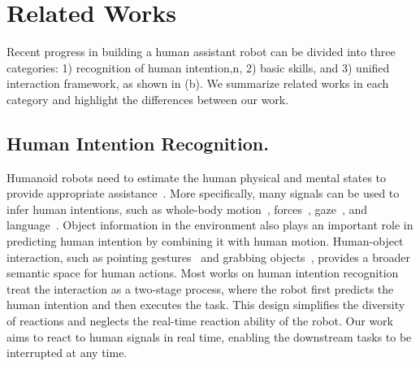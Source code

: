 
\section{Related Works}
Recent progress in building a human assistant robot can be divided into three categories: 1) recognition of human intention,n, 2) basic skills, and 3) unified interaction framework, as shown in (b).
We summarize related works in each category and highlight the differences between our work.

\subsection{Human Intention Recognition.}
Humanoid robots need to estimate the human physical and mental states to provide appropriate assistance~\cite{vianelloHumanHumanoidInteractionCooperation2021}.
More specifically, many signals can be used to infer human intentions, such as whole-body motion~\cite{tulbureFastPerceptionHumanRobot2024, yangReactiveHumantoRobotHandovers2021}, forces~\cite{agravante2019human}, gaze~\cite{duarteActionAnticipationReading2018,scherfAreYouSure2024}, and language~\cite{tanneberg2024help}.
Object information in the environment also plays an important role in predicting human intention by combining it with human motion.
Human-object interaction, such as pointing gestures~\cite{fangEgoPAT3Dv2Predicting3D2024} and grabbing objects~\cite{mascaro2023hoi4abot}, provides a broader semantic space for human actions.
Most works on human intention recognition treat the interaction as a two-stage process, where the robot first predicts the human intention and then executes the task. This design simplifies the diversity of reactions and neglects the real-time reaction ability of the robot. Our work aims to react to human signals in real time, enabling the downstream tasks to be interrupted at any time.

